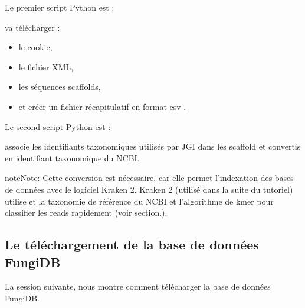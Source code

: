 \documentclass[letterpaper,10pt,french]{sphinxmanual}
\begin{document}
Le premier script Python est :

\begin{sphinxVerbatim}[commandchars=\\\{\}]
\end{sphinxVerbatim}

 va télécharger :
\begin{itemize}
\item {} 
le cookie,

\item {} 
le fichier XML,

\item {} 
les séquences scaffolds,

\item {} 
et créer un fichier récapitulatif en format csv .

\end{itemize}

Le second script Python est :

\begin{sphinxVerbatim}[commandchars=\\\{\}]
\end{sphinxVerbatim}

 associe les identifiants taxonomiques utilisés par JGI dans les scaffold et convertis en identifiant taxonomique du NCBI.

\begin{sphinxadmonition}{note}{Note:}
Cette conversion est nécessaire, car elle permet l’indexation des bases de données avec le logiciel Kraken 2. Kraken 2 (utilisé dans la suite du tutoriel) utilise et la taxonomie de référence du NCBI et l’algorithme de k\sphinxhyphen{}mer pour classifier les reads rapidement (voir section.).
\end{sphinxadmonition}


\subsection{Le téléchargement de la base de données FungiDB}
\label{\detokenize{tutorial:le-telechargement-de-la-base-de-donnees-fungidb}}\label{\detokenize{tutorial:download-fungidb}}
La session suivante, nous montre comment télécharger la base de données FungiDB.
\end{document}
